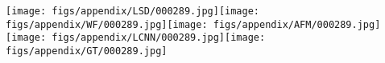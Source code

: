 \documentclass[10pt,twocolumn,letterpaper]{article}
\begin{document}
\texttt{[image: figs/appendix/LSD/000289.jpg]}\texttt{[image: figs/appendix/WF/000289.jpg]}\texttt{[image: figs/appendix/AFM/000289.jpg]}\texttt{[image: figs/appendix/LCNN/000289.jpg]}\texttt{[image: figs/appendix/GT/000289.jpg]}


































 
 
\end{document}
